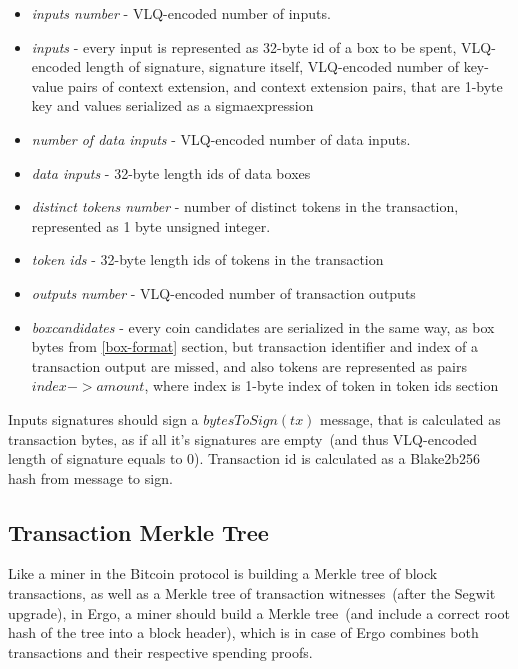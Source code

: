\documentclass[]{article}   %
\newcommand{\coin}{box}
\newcommand{\sigm}{sigma}
\begin{document}
\begin{itemize}
    \item{\em inputs number} - VLQ-encoded number of inputs.
    \item{\em inputs} - every input is represented as 32-byte id of a \coin{} to be spent, VLQ-encoded
    length of signature, signature itself, VLQ-encoded number of key-value pairs of context extension,
    and context extension pairs, that are 1-byte key and values serialized as a \sigm expression
    \item{\em number of data inputs} - VLQ-encoded number of data inputs.
    \item{\em data inputs} - 32-byte length ids of data boxes
    \item{\em distinct tokens number} - number of distinct tokens in the transaction, represented as
    1 byte unsigned integer.
    \item{\em token ids} - 32-byte length ids of tokens in the transaction
    \item{\em outputs number} - VLQ-encoded number of transaction outputs
    \item{\em \coin candidates} - every coin candidates are serialized in the same way, as \coin{} bytes
    from \ref{box-format} section, but transaction identifier and index of a transaction output are missed,
    and also tokens are represented as pairs $index -> amount$, where index is 1-byte index of token
    in token ids section
\end{itemize}

Inputs signatures should sign a $bytesToSign(tx)$ message, that is calculated as transaction bytes,
as if all it's signatures are empty~(and thus VLQ-encoded length of signature equals to 0).
Transaction id is calculated as a Blake2b256 hash from message to sign.

\subsection{Transaction Merkle Tree}
\label{tx-tree}

Like a miner in the Bitcoin protocol is building a Merkle tree of block transactions, as well as a Merkle tree of
transaction witnesses~(after the Segwit upgrade), in Ergo, a miner should build a Merkle tree~(and include a correct
 root hash of the tree into a block header), which is in case of Ergo combines both transactions and their respective
 spending proofs.
\end{document}
